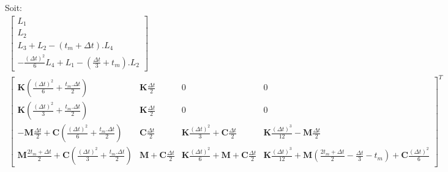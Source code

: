 \documentclass[12pt,a4paper]{report}
\begin{document}
Soit:
\begin{equation}
\!\!\!\!\!\!\!\!\!\!\!\!\!\!\!\!\!\!\!\!\!\!\!\!\!\!\!\!\!\!\!\!\!\!\!\!\!\!\!\!\!\!\!\!\!\!\!\!
\begin{array}{c}
	\begin{bmatrix}	
		  L_1
		\\ L_2
		\\ L_3 + L_2 - (t_m+\Delta t).L_4
		\\  -\frac{(\Delta t)^2}{6} L_4 
			+ L_1 
			- \left( \frac{\Delta t}{3} + t_m \right).L_2
	\end{bmatrix}
	\\
		\begin{bmatrix}	   
			   \mathbf{K}
				   \left( \frac{(\Delta t)^2}{6} + \frac{t_m.\Delta t}{2}
				   \right)
			&
		   		\mathbf{K} \frac{\Delta t}{2}
		   	&   
		   		0
			&
		   		0
		\\   
			   \mathbf{K}
				   \left( \frac{(\Delta t)^2}{3} + \frac{t_m.\Delta t}{2}
				   \right)
			&
		   		\mathbf{K} \frac{\Delta t}{2} 
		   	&
		   		0
			&
		   		0
		\\   
			   -\mathbf{M}
			   		\frac{\Delta t}{2} 
			   +\mathbf{C}
			   		\left( \frac{(\Delta t)^2}{6} 
			   				+ \frac{t_m.\Delta t}{2} \right)  
		   	& 
		   		\mathbf{C} \frac{\Delta t}{2}
		   	&
			   	\mathbf{K}
			   		\frac{(\Delta t)^2}{3} 
		   		+\mathbf{C} \frac{\Delta t}{2}
		   	&
		   		\mathbf{K} \frac{(\Delta t)^3}{12}
		   		-\mathbf{M}
			   		\frac{\Delta t}{2} 
		\\   
			   \mathbf{M}
			   		\frac{2t_m + \Delta t}{2} 
			   +\mathbf{C}
			   		\left( \frac{(\Delta t)^2}{3} 
			   				+ \frac{t_m.\Delta t}{2}\right)
		   	&
			   \mathbf{M} 
			   +\mathbf{C} \frac{\Delta t}{2}
		   	&
		   		\mathbf{K} \frac{(\Delta t)^2}{6} 
		   		+\mathbf{M} 
			   	+\mathbf{C} \frac{\Delta t}{2}
		   	&
		   		\mathbf{K} \frac{(\Delta t)^3}{12}
		   		+\mathbf{M} 
		   			\left( \frac{2t_m + \Delta t}{2} 
		   					-\frac{\Delta t}{3} - t_m 
		   					\right)
			   +\mathbf{C} \frac{(\Delta t)^2}{6} 
	\end{bmatrix}^T
\end{array}
\end{equation}
\end{document}
